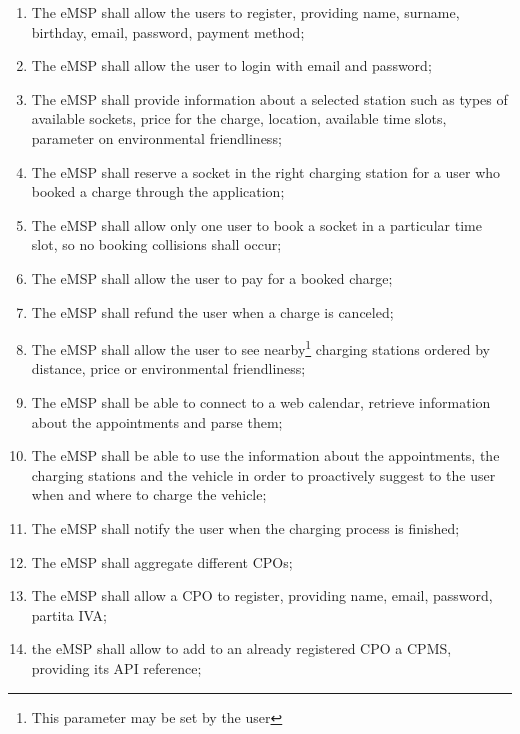 \begin{enumerate}[label=\textbf{R\arabic*}]
    \item The \ac{eMSP} shall allow the users to register, providing name, surname, birthday, email, password, payment method;\label{req:eMSP-user-registration}
    \item The \ac{eMSP} shall allow the user to login with email and password;\label{req:eMSP-user-login}
    \item The \ac{eMSP} shall provide information about a selected station such as types of available sockets, price for the charge, location, available time slots, parameter on environmental friendliness;\label{req:eMSP-info-station}
    \item The \ac{eMSP} shall reserve a socket in the right charging station for a user who booked a charge through the application;\label{req:eMSP-reserve-socket}
    \item The \ac{eMSP} shall allow only one user to book a socket in a particular time slot, so no booking collisions shall occur;\label{req:eMSP-no-book-collisions}
    \item The \ac{eMSP} shall allow the user to pay for a booked charge;\label{req:eMSP-payment}
    \item The \ac{eMSP} shall refund the user when a charge is canceled;\label{req:eMSP-refund}
    \item The \ac{eMSP} shall allow the user to see nearby\footnote{This parameter may be set by the user} charging stations ordered by distance, price or environmental friendliness;\label{req:eMSP-see-stations}
    \item The \ac{eMSP} shall be able to connect to a web calendar, retrieve information about the appointments and parse them;\label{req:eMSP-connect-calendar}
    \item The \ac{eMSP} shall be able to use the information about the appointments, the charging stations and the vehicle in order to proactively suggest to the user when and where to charge the vehicle;\label{req:eMSP-proactive-suggestions}
    \item The \ac{eMSP} shall notify the user when the charging process is finished;\label{req:eMSP-notification}
    \item The \ac{eMSP} shall aggregate different \acp{CPO};\label{req:eMSP-compatible}
    \item The \ac{eMSP} shall allow a \ac{CPO} to register, providing name, email, password, \gls{partita IVA};\label{req:eMSP-cpo-registration}
    \item the \ac{eMSP} shall allow to add to an already registered \ac{CPO} a \ac{CPMS}, providing its \ac{API} reference;\label{req:eMSP-add-cpms}

\end{enumerate}
